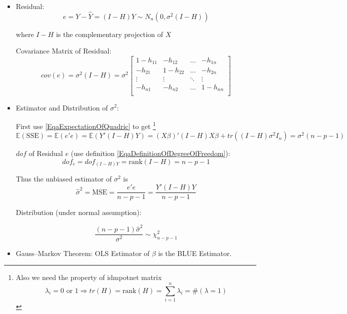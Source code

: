 \begin{itemize}[topsep=2pt,itemsep=2pt]
    \item Residual:
    \begin{equation}\label{EqaMatrixNotationOfResidual}
        e=Y-\hat{Y}=(I-H)Y\sim N_n\left(0 , \sigma ^2(I-H) \right)
    \end{equation}

    where $ I-H $ is the complementary projection of $ X $

    Covariance Matrix of Residual:
    \begin{equation}
        cov(e)=\sigma ^2(I-H)=
        \sigma ^2\begin{bmatrix}
        1-h_{11}&-h_{12}&\ldots&-h_{1n}\\
        -h_{21}&1-h_{22}&\ldots&-h_{2n}\\
        \vdots&\vdots&\ddots&\vdots\\
        -h_{n1}&-h_{n2}&\ldots&1-h_{nn}\\
        \end{bmatrix}
    \end{equation}
    
    
    \item Estimator and Distribution of  $ \sigma ^2 $:
    
    First use \autoref{EqaExpectationOfQuadric} to get \footnote{Also we need the property of idmpotnet matrix
    \begin{equation}
        \lambda_i=0\text{ or }1\Rightarrow tr(H)=\mathrm{rank}(H)=\sum_{i=1}^n\lambda _i=\# (\lambda =1) 
    \end{equation}
    }
    \begin{equation}\label{EqaExpectationOfSSE}
        \mathbb{E}(\mathrm{SSE})=\mathbb{E}(e'e)=\mathbb{E}(Y'(I-H)Y)=(X\beta )'(I-H)X\beta +tr((I-H)\sigma ^2I_n) =\sigma ^2(n-p-1)
    \end{equation}

    $ dof $ of Residual $ e $ (use definition \autoref{EqaDefinitionOfDegreeOfFreedom}):
    \begin{equation}
        dof_e=dof_{(I-H)Y}=\mathrm{rank}(I-H)=n-p-1 
    \end{equation}
    
    
    
    Thus the unbiased estimator of $ \sigma ^2 $ is 
    \begin{equation}
        \hat{\sigma }^2=\mathrm{MSE}=\dfrac{e'e}{n-p-1}=\dfrac{Y'(I-H)Y}{n-p-1}
    \end{equation}

    Distribution (under normal assumption):
    
    \begin{equation}\label{EqaDistributionOfMultiVariateSigma}
        \dfrac{(n-p-1)\hat{\sigma }^2}{\sigma ^2}\sim \chi^2_{n-p-1}
    \end{equation}
    
    \item Gauss–Markov Theorem: OLS Estimator of $ \beta  $ is the BLUE Estimator.
\end{itemize}


